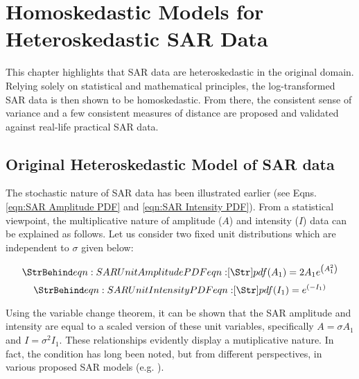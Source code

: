 \chapter{Homoskedastic Models for Heteroskedastic SAR Data} %
\label{chap:sar}

This chapter  highlights that SAR
                data are heteroskedastic in the original domain.
Relying solely on statistical and mathematical principles,             
the log-transformed SAR data is then shown to be homoskedastic.
From there, the consistent sense of variance and a few consistent measures of distance are proposed and validated against real-life
                practical SAR data.

\section{Original Heteroskedastic Model of SAR data}

The stochastic nature of SAR data has been illustrated earlier (see Eqns. \ref{eqn:SAR Amplitude PDF} and \ref{eqn:SAR Intensity PDF}).
From a statistical viewpoint, the multiplicative nature of amplitude ($A$) and intensity ($I$)  data can be explained as follows. 
Let us consider two fixed unit distributions which are independent to $\sigma$ given below:

\begin{equation}
\label{eqn:SAR Unit Amplitude PDF}
\caption{eqn:SAR Unit Amplitude PDF}
pdf(A_1) = 2A_1 e^{ \left( A_1^2 \right) }
\end{equation}
\begin{equation}
  \label{eqn:SAR Unit Intensity PDF}
  \caption{eqn:SAR Unit Intensity PDF}
pdf(I_1) = e^{ \left( -I_1 \right) }
\end{equation}

Using the variable change theorem,
    it can be shown that
    the SAR amplitude and intensity are equal to %
    a scaled version of these unit variables,
    specifically $A= \sigma A_1 $ and $I= \sigma^2 I_1 $. 
These relationships evidently display a mutiplicative nature. 
In fact, the condition has long been noted,
  but from different perspectives,
  in various proposed SAR models (e.g. \cite{Jakeman_1980_JPhysAMathGen}).

